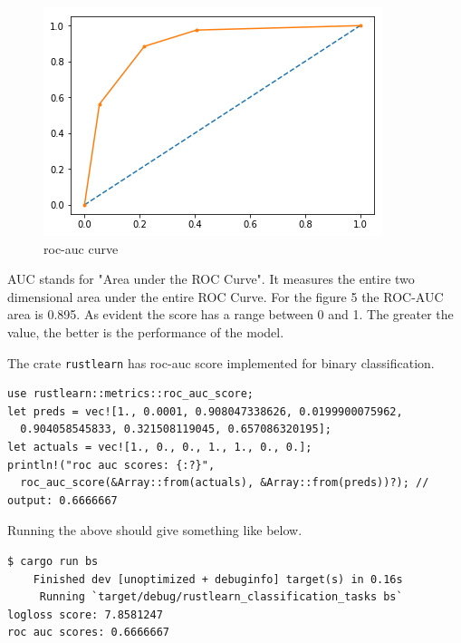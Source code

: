\documentclass{book}
\begin{document}
\begin{figure}[htpb]
	\centering
	\includegraphics[width=0.8\linewidth]{rocauc.png}
	\caption{roc-auc curve}
	\label{fig:rocauc}
\end{figure}

AUC stands for "Area under the ROC Curve". It measures the entire two dimensional area under the entire ROC Curve. For the figure 5 the ROC-AUC area is 0.895. As evident the score has a range between 0 and 1. The greater the value, the better is the performance of the model.

The crate \lstinline{rustlearn} has roc-auc score implemented for binary classification.

\begin{lstlisting}[caption={chaper3\\/rustlearn\_classification\_tasks\\/src\\/binary\_class\_scores\\.rs}]
use rustlearn::metrics::roc_auc_score;
let preds = vec![1., 0.0001, 0.908047338626, 0.0199900075962,
  0.904058545833, 0.321508119045, 0.657086320195];
let actuals = vec![1., 0., 0., 1., 1., 0., 0.];
println!("roc auc scores: {:?}",
  roc_auc_score(&Array::from(actuals), &Array::from(preds))?); // output: 0.6666667
\end{lstlisting}

Running the above should give something like below.

\begin{lstlisting}[caption={chaper3\\/rustlearn\_classification\_tasks\\/src\\/binary\_class\_scores\\.rs}]
$ cargo run bs
    Finished dev [unoptimized + debuginfo] target(s) in 0.16s
     Running `target/debug/rustlearn_classification_tasks bs`
logloss score: 7.8581247
roc auc scores: 0.6666667
\end{lstlisting}
\label{par:roc_auc}
\end{document}
